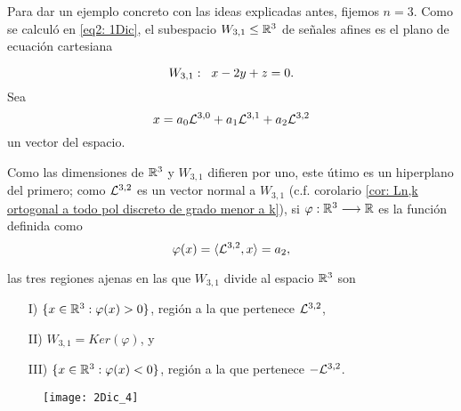 \begin{ejemplo}
\label{subs: ejm 3}
Para dar un ejemplo concreto 
con las ideas explicadas antes, fijemos $n=3$.
Como se calculó en \eqref{eq2: 1Dic},
el subespacio $W_{3,1} \leq \mathbb{R}^{3}$ de señales afines es el plano
de ecuación cartesiana

\[
W_{3,1}: \hspace{0.2cm} x-2y+z=0.
\]
Sea 
\begin{equation*}
\label{eq0: 9Feb}
x=a_{0}\mathcal{L}^{3,0}+a_{1}\mathcal{L}^{3,1}+a_{2}\mathcal{L}^{3,2}
\end{equation*}
un vector del espacio.


Como las dimensiones de $\mathbb{R}^{3}$ y $W_{3,1}$ 
difieren por uno,
este útimo es un hiperplano
del primero; como $\mathcal{L}^{3,2}$
es un vector normal a $W_{3,1}$
(c.f. corolario \ref{cor: Ln,k ortogonal a todo pol discreto de grado menor a k}), 
si $\varphi: \mathbb{R}^{3} \longrightarrow \mathbb{R}$ es la función
definida como
\begin{equation}
\label{eq: funcion phi ejemplo}
\varphi(x)= \langle \mathcal{L}^{3,2} , x \rangle =a_{2},
\end{equation}


\noindent
las tres regiones ajenas en las
que $W_{3,1}$ divide al espacio
$\mathbb{R}^{3}$ son 


\begin{itemize}
\item[I)] $\{ x \in \mathbb{R}^{3} : \varphi(x)>0 \}$,
región a la que pertenece $\mathcal{L}^{3,2}$,
\item[II)] $W_{3,1}= Ker(\varphi)$, y 
\item[III)] $\{ x \in \mathbb{R}^{3} : \varphi(x)<0 \}$,
región a la que pertenece $-\mathcal{L}^{3,2}$.
\end{itemize}

\begin{figure}[H]
	\centering
	\texttt{[image: 2Dic\_4]} 
\end{figure}


\end{ejemplo}
